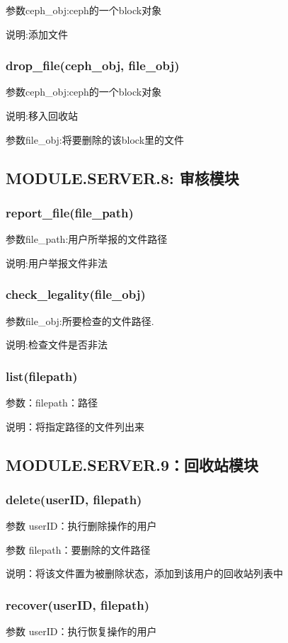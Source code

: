 参数ceph\_obj:ceph的一个block对象

说明:添加文件

\subsubsection{drop\_file(ceph\_obj, file\_obj)}
参数ceph\_obj:ceph的一个block对象

说明:移入回收站

参数file\_obj:将要删除的该block里的文件
\subsection{MODULE.SERVER.8: 审核模块}
\subsubsection{report\_file(file\_path)}
参数file\_path:用户所举报的文件路径

说明:用户举报文件非法

\subsubsection{check\_legality(file\_obj)}
参数file\_obj:所要检查的文件路径.

说明:检查文件是否非法


\subsubsection{list(filepath)}
参数：filepath：路径

说明：将指定路径的文件列出来


\subsection{MODULE.SERVER.9：回收站模块}

\subsubsection{delete(userID, filepath)}
参数 userID：执行删除操作的用户

参数 filepath：要删除的文件路径

说明：将该文件置为被删除状态，添加到该用户的回收站列表中

\subsubsection{recover(userID, filepath)}
参数 userID：执行恢复操作的用户

